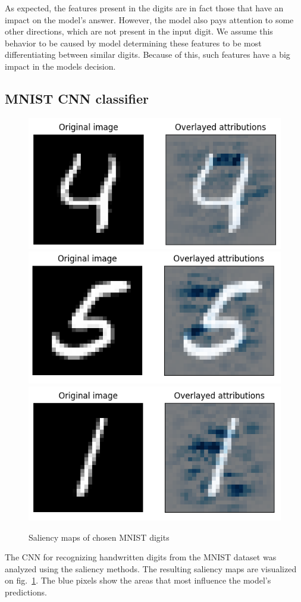 \documentclass[journal, a4paper]{IEEEtran}
\begin{document}
As expected, the features present in the digits are in fact those that have an impact on the model's answer.
However, the model also pays attention to some other directions, which are not present in the input digit.
We assume this behavior to be caused by model determining these features to be most differentiating between similar digits.
Because of this, such features have a big impact in the models decision.

\subsection{MNIST CNN classifier}\label{subsec:experiment-mnist-cnn}

\begin{figure}[ht]\centering
    \includegraphics[width=.6\linewidth]{img/saliency_mnist/4.png}
    \includegraphics[width=.6\linewidth]{img/saliency_mnist/5.png}
    \includegraphics[width=.6\linewidth]{img/saliency_mnist/1.png}
    \caption{Saliency maps of chosen MNIST digits}\label{fig:mnist-cnn-saliency}
\end{figure}

The CNN for recognizing handwritten digits from the MNIST dataset was analyzed using the saliency methods.
The resulting saliency maps are visualized on fig.~\ref{fig:mnist-cnn-saliency}.
The blue pixels show the areas that most influence the model's predictions.
\end{document}
